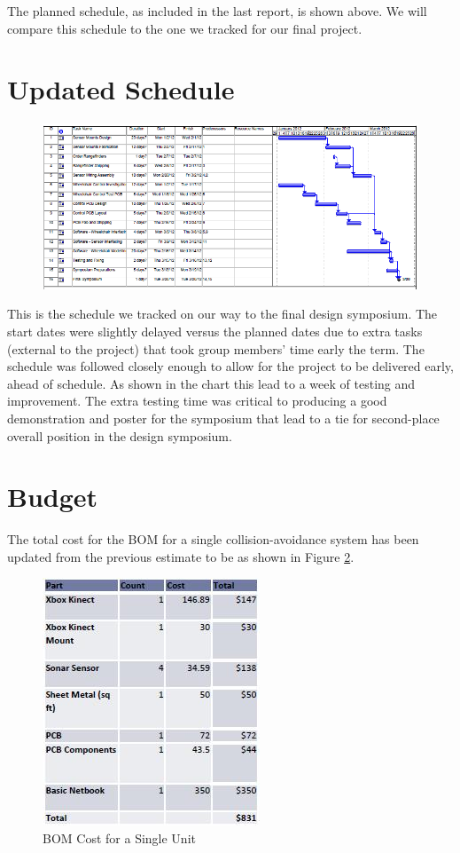 \documentclass[oneside,final,a4paper]{report}
\begin{document}
The planned schedule, as included in the last report, is shown above. We will compare this schedule to the one we tracked for our final project.

\section{Updated Schedule}
\begin{figure}
 \centering
 \includegraphics[scale=0.55]{Final_Schedule} \label{fig:final_schel}
\end{figure}

This is the schedule we tracked on our way to the final design symposium. The start dates were slightly delayed versus the planned dates due to extra tasks (external to the project) that took group members' time early the term. The schedule was followed closely enough to allow for the project to be delivered early, ahead of schedule. As shown in the chart this lead to a week of testing and improvement. The extra testing time was critical to producing a good demonstration and poster for the symposium that lead to a tie for second-place overall position in the design symposium.

\section{Budget}
The total cost for the BOM for a single collision-avoidance system has been updated from the previous estimate to be as shown in Figure \ref{fig:BOM_single}.

\begin{figure}[hbt]
 \centering
 \includegraphics[scale=1]{BOM_single}
 \caption{BOM Cost for a Single Unit}
 \label{fig:BOM_single}
\end{figure}
\end{document}
